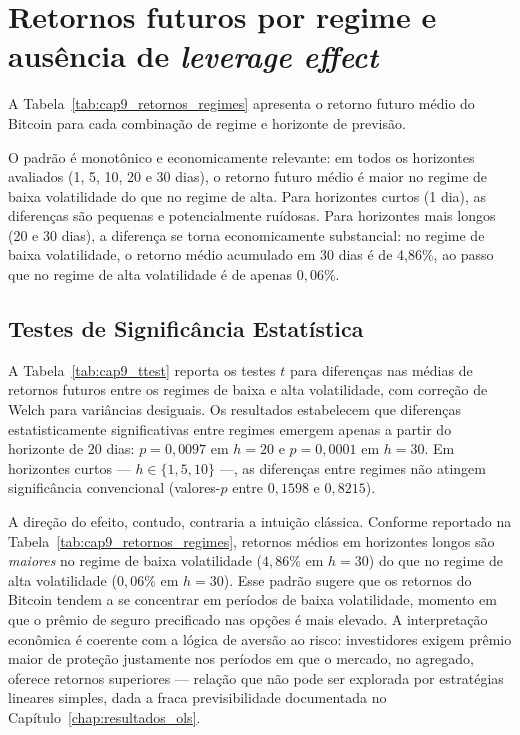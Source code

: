 \section{Retornos futuros por regime e ausência de \textit{leverage effect}}
\label{sec:cap6_retornos_regime}

A Tabela~\ref{tab:cap9_retornos_regimes} apresenta o retorno futuro médio do Bitcoin
para cada combinação de regime e horizonte de previsão.



O padrão é monotônico e economicamente relevante: em todos os horizontes avaliados
(1, 5, 10, 20 e 30 dias), o retorno futuro médio é maior no regime de baixa
volatilidade do que no regime de alta. Para horizontes curtos (1 dia), as diferenças
são pequenas e potencialmente ruídosas. Para horizontes mais longos (20 e 30 dias),
a diferença se torna economicamente substancial: no regime de baixa volatilidade,
o retorno médio acumulado em 30 dias é de 4,86\%, ao passo que no regime de alta
volatilidade é de apenas $0{,}06\%$.

\subsection{Testes de Significância Estatística}
\label{sec:cap9_ttest}

A Tabela~\ref{tab:cap9_ttest} reporta os testes $t$ para diferenças nas médias de retornos futuros entre os regimes de baixa e alta volatilidade, com correção de Welch para variâncias desiguais. Os resultados estabelecem que diferenças estatisticamente significativas entre regimes emergem apenas a partir do horizonte de $20$ dias: $p = 0{,}0097$ em $h = 20$ e $p = 0{,}0001$ em $h = 30$. Em horizontes curtos --- $h \in \{1, 5, 10\}$ ---, as diferenças entre regimes não atingem significância convencional (valores-$p$ entre $0{,}1598$ e $0{,}8215$).



A direção do efeito, contudo, contraria a intuição clássica. Conforme reportado na Tabela~\ref{tab:cap9_retornos_regimes}, retornos médios em horizontes longos são \emph{maiores} no regime de baixa volatilidade ($4{,}86\%$ em $h = 30$) do que no regime de alta volatilidade ($0{,}06\%$ em $h = 30$). Esse padrão sugere que os retornos do Bitcoin tendem a se concentrar em períodos de baixa volatilidade, momento em que o prêmio de seguro precificado nas opções é mais elevado. A interpretação econômica é coerente com a lógica de aversão ao risco: investidores exigem prêmio maior de proteção justamente nos períodos em que o mercado, no agregado, oferece retornos superiores --- relação que não pode ser explorada por estratégias lineares simples, dada a fraca previsibilidade documentada no Capítulo~\ref{chap:resultados_ols}.

